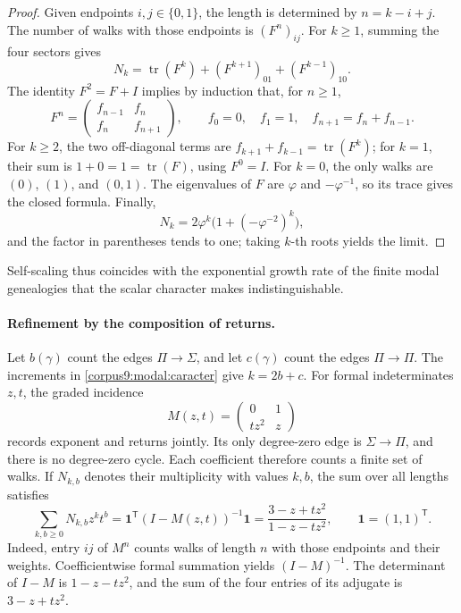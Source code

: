 \begin{proof}
Given endpoints \(i,j\in\{0,1\}\), the length is determined by
\(n=k-i+j\). The number of walks with those endpoints is
\((F^n)_{ij}\). For \(k\geq1\), summing the four sectors gives
\[
 N_k=\operatorname{tr}(F^k)
      +(F^{k+1})_{01}+(F^{k-1})_{10}.
\]
The identity \(F^2=F+I\) implies by induction that, for \(n\geq1\),
\[
 F^n=\begin{pmatrix}f_{n-1}&f_n\\f_n&f_{n+1}\end{pmatrix},
 \qquad f_0=0,\quad f_1=1,\quad f_{n+1}=f_n+f_{n-1}.
\]
For \(k\geq2\), the two off-diagonal terms are
\(f_{k+1}+f_{k-1}=\operatorname{tr}(F^k)\); for \(k=1\),
their sum is \(1+0=1=\operatorname{tr}(F)\), using \(F^0=I\).
For \(k=0\), the only walks are \((0)\), \((1)\), and \((0,1)\).
The eigenvalues of \(F\) are \(\varphi\) and \(-\varphi^{-1}\),
so its trace gives the closed formula. Finally,
\[
 N_k=2\varphi^k\bigl(1+(-\varphi^{-2})^k\bigr),
\]
and the factor in parentheses tends to one; taking \(k\)-th roots
yields the limit.
\end{proof}

Self-scaling thus coincides with the exponential growth rate
of the finite modal genealogies that the scalar character
makes indistinguishable.

\paragraph{Refinement by the composition of returns.}
Let \(b(\gamma)\) count the edges \(\Pi\to\Sigma\), and let
\(c(\gamma)\) count the edges \(\Pi\to\Pi\). The increments in
\eqref{corpus9:modal:caracter} give \(k=2b+c\).
For formal indeterminates \(z,t\), the graded incidence
\[
 M(z,t)=\begin{pmatrix}0&1\\tz^2&z\end{pmatrix}
\]
records exponent and returns jointly. Its only degree-zero edge
is \(\Sigma\to\Pi\), and there is no degree-zero cycle.
Each coefficient therefore counts a finite set of walks.
If \(N_{k,b}\) denotes their multiplicity with values \(k,b\),
the sum over all lengths satisfies
\begin{equation}
 \sum_{k,b\geq0}N_{k,b}z^kt^b
 =\mathbf1^{\mathsf T}(I-M(z,t))^{-1}\mathbf1
 =\frac{3-z+tz^2}{1-z-tz^2},
 \qquad \mathbf1=(1,1)^{\mathsf T}.
 \label{corpus9:modal:serie-graduada}
\end{equation}
Indeed, entry \(ij\) of \(M^n\) counts walks of length \(n\)
with those endpoints and their weights. Coefficientwise formal
summation yields \((I-M)^{-1}\). The determinant of \(I-M\)
is \(1-z-tz^2\), and the sum of the four entries of its adjugate
is \(3-z+tz^2\).

